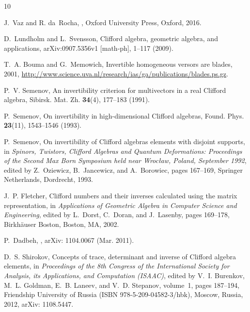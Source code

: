 \documentclass{birkjour}
\begin{document}
%
%


\begin{thebibliography}{10}

J.~Vaz and R. {da}~Rocha,
,
\newblock Oxford University Press, Oxford, 2016.

D.~Lundholm and L.~Svensson,
\newblock Clifford algebra, geometric algebra, and applications,
\newblock arXiv:0907.5356v1 [math-ph], 1--117 (2009).


T.~A. Bouma and G.~Memowich,
\newblock Invertible homogeneous versors are blades, 2001,
\url{http://www.science.uva.nl/research/ias/ga/publications/blades.ps.gz}.

P.~V. Semenov,
\newblock An invertibility criterion for multivectors in a real Clifford
  algebra,
\newblock Sibirsk. Mat. Zh. {\bf 34}(4), 177--183 (1991).

P.~Semenov,
\newblock On invertibility in high-dimensional {C}lifford algebras,
\newblock Found. Phys. {\bf 23}(11), 1543--1546 (1993).

P.~Semenov,
\newblock On invertibility of {C}lifford algebras elements with disjoint
  supports,
\newblock in {\em Spinors, Twistors, Clifford Algebras and Quantum
  Deformations: Proceedings of the Second Max Born Symposium held near
  Wroc{\l}aw, Poland, September 1992}, edited by Z.~Oziewicz, B.~Jancewicz, and
  A.~Borowiec, pages 167--169, Springer Netherlands, Dordrecht, 1993.

J.~P. Fletcher,
\newblock Clifford numbers and their inverses calculated using the matrix
  representation,
\newblock in {\em Applications of Geometric Algebra in Computer Science and
  Engineering}, edited by L.~Dorst, C.~Doran, and J.~Lasenby, pages 169--178,
  Birkh{\"a}user Boston, Boston, MA, 2002.

P.~{Dadbeh},
,
\newblock arXiv: 1104.0067  (Mar. 2011).

D.~S. Shirokov,
\newblock Concepts of trace, determinant and inverse of {C}lifford algebra
  elements,
\newblock in {\em Proceedings of the 8th Congress of the International Society
  for Analysis, its Applications, and Computation (ISAAC)}, edited by V.~I.
  Burenkov, M.~L. Goldman, E.~B. Laneev, and V.~D. Stepanov, volume~1, pages
  187--194, Friendship University of Russia (ISBN 978-5-209-04582-3/hbk),
  Moscow, Russia, 2012,
\newblock arXiv: 1108.5447.


\end{thebibliography}
\end{document}
